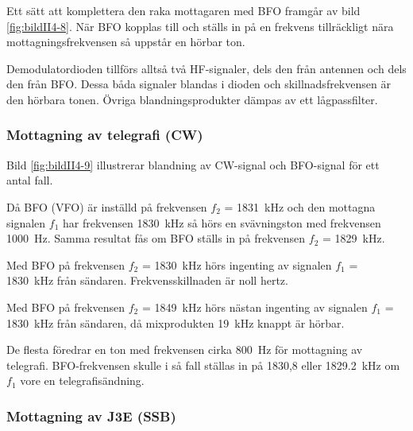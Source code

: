Ett sätt att komplettera den raka mottagaren med BFO framgår av bild
\ref{fig:bildII4-8}.
När BFO kopplas till och ställs in på en frekvens tillräckligt
nära mottagningsfrekvensen så uppstår en hörbar ton.

Demodulatordioden tillförs alltså två HF-signaler, dels den från
antennen och dels den från BFO.
Dessa båda signaler blandas i dioden och skillnadsfrekvensen är den hörbara
tonen.
Övriga blandningsprodukter dämpas av ett lågpassfilter.



\newpage
\subsubsection{Mottagning av telegrafi (CW)}

Bild \ref{fig:bildII4-9} illustrerar blandning av CW-signal och BFO-signal
för ett antal fall.

Då BFO (VFO) är inställd på frekvensen \(f_2\) = \SI{1831}{\kilo\hertz} och den
mottagna signalen \(f_1\) har frekvensen \SI{1830}{\kilo\hertz} så hörs en
svävningston med frekvensen \SI{1000}{\hertz}.
Samma resultat fås om BFO ställs in på frekvensen \(f_2\) =
\SI{1829}{\kilo\hertz}.

Med BFO på frekvensen \(f_2\) = \SI{1830}{\kilo\hertz} hörs ingenting av
signalen \(f_1\) = \SI{1830}{\kilo\hertz} från sändaren.
Frekvensskillnaden är noll hertz.

Med BFO på frekvensen \(f_2\) = \SI{1849}{\kilo\hertz} hörs nästan ingenting av
signalen \(f_1\) = \SI{1830}{\kilo\hertz} från sändaren, då mixprodukten
\SI{19}{\kilo\hertz} knappt är hörbar.

De flesta föredrar en ton med frekvensen cirka \SI{800}{\hertz} för mottagning
av telegrafi.
BFO-frekvensen skulle i så fall ställas in på 1830,8 eller
\SI{1829,2}{\kilo\hertz} om \(f_1\) vore en telegrafisändning.


\subsubsection{Mottagning av J3E (SSB)}

